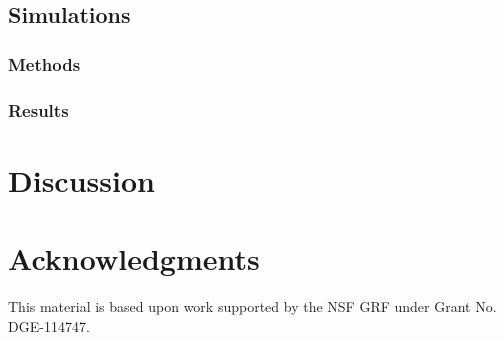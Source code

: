 \documentclass{article}
\begin{document}
\subsection{Simulations}
\subsubsection{Methods}
\subsubsection{Results}

\section{Discussion}

\section{Acknowledgments}
This material is based upon work supported by the NSF GRF under Grant No. DGE-114747.



\end{document}
